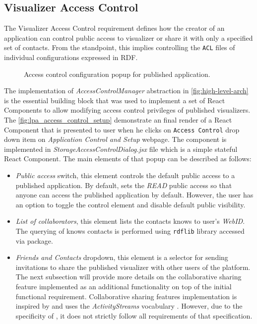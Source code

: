 \subsection{Visualizer Access Control}

The Visualizer Access Control requirement defines how the creator of an application can control public access to visualizer or share it with only a specified set of contacts. From the \lpas{} standpoint, this implies controlling the \texttt{ACL} files of individual \lpa{} configurations expressed in RDF.

\begin{figure}[h]
\centering
{}
\caption{Access control configuration popup for published application.}
\label{fig:lpa_access_control_setup}
\end{figure}

The implementation of \textit{AccessControlManager} abstraction in \autoref{fig:high-level-arch} is the essential building block that was used to implement a set of React Components to allow modifying access control privileges of published visualizers. The \autoref{fig:lpa_access_control_setup} demonstrate an final render of a React Component that is presented to user when he clicks on \texttt{Access Control} drop down item on \textit{Application Control and Setup} webpage. The component is implemented in \textit{StorageAccessControlDialog.jsx} file which is a simple stateful React Component. The main elements of that popup can be described as follows:
\begin{itemize}
    \item \textit{Public access} switch, this element controls the default public access to a published application. By default, \lpa{} sets the \textit{READ} public access so that anyone can access the published application by default. However, the user has an option to toggle the control element and disable default public visibility. 
    \item \textit{List of collaborators}, this element lists the contacts knows to user's \textit{WebID}. The querying of knows contacts is performed using \texttt{rdflib} library accessed via \lpas{} package. 
    \item \textit{Friends and Contacts} dropdown, this element is a selector for sending invitations to share the published visualizer with other users of the platform. The next subsection will provide more details on the collaborative sharing feature implemented as an additional functionality on top of the initial functional requirement. Collaborative sharing features implementation is inspired by  and uses the \textit{ActivityStreams} vocabulary . However, due to the specificity of \lpa{}, it does not strictly follow all requirements of that specification. 
\end{itemize}

